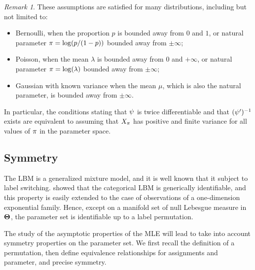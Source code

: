 \documentclass[bj]{imsart}
\numberwithin{equation}{section}
\theoremstyle{plain}
\theoremstyle{remark}
\newtheorem{rem}[thm]{Remark}
\begin{document}
\begin{rem}
These assumptions are satisfied for many distributions, including but not limited to:
\begin{itemize}
\item Bernoulli, when the proportion $p$ is bounded away from $0$ and $1$, or natural parameter $\pi = \log(p / (1 - p))$ bounded away from $\pm \infty$;
\item Poisson, when the mean $\lambda$ is bounded away from $0$ and $+\infty$, or natural parameter $\pi = \log(\lambda)$ bounded away from $\pm \infty$;
\item Gaussian with known variance when the mean $\mu$, which is also the natural parameter, is bounded away from $\pm \infty$.
\end{itemize}
In particular, the conditions stating that $\psi$ is twice differentiable and that $(\psi')^{-1}$ exists are equivalent to assuming that $X_{\pi}$ has positive and finite variance for all values of $\pi$ in the parameter space.
\end{rem}







\subsection{Symmetry}
\label{sec:definitions}
The LBM is a generalized mixture model, and it is well known that it subject to label switching. \cite{keribin2015estimation} showed that the categorical LBM is generically identifiable, and this property is easily extended to the case of observations of a one-dimension exponential family. Hence, except on a manifold set of null Lebesgue measure in $\boldsymbol{\Theta}$, the parameter set is identifiable up to a label permutation. 

The study of the asymptotic properties of the MLE will lead to take into account symmetry properties on the parameter set. We first recall the definition of a permutation, then define equivalence relationships for assignments and parameter, and  precise symmetry. 
\end{document}
